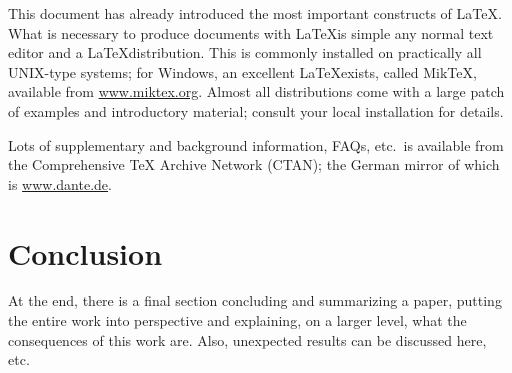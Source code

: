\documentclass[12pt,twoside,doublepage]{article}
\begin{document}
This document has already introduced the most important constructs of
\LaTeX. What is necessary to produce documents with \LaTeX is simple
any normal text editor and a \LaTeX distribution. This is commonly
installed on practically all UNIX-type systems; for Windows, an
excellent \LaTeX exists, called MikTeX, available from
\url{www.miktex.org}. Almost all distributions come with a large patch
of examples and introductory material; consult your local installation
for details.

Lots of supplementary and background information, FAQs, etc.\ is
available from the Comprehensive TeX Archive Network (CTAN); the
German mirror of which is \url{www.dante.de}.

\section{Conclusion}
\label{sec:concl}

At the end, there is a final section concluding and summarizing a
paper, putting the entire work into perspective and explaining, on a
larger level, what the consequences of this work are. Also, unexpected
results can be discussed here, etc.





\end{document}
